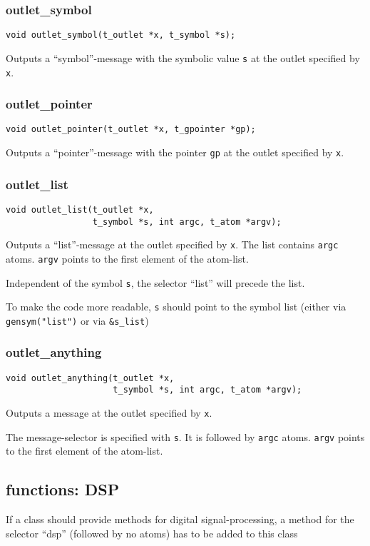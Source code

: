 \documentclass[12pt, a4paper,english,titlepage]{article}
\begin{document}
\begin{appendix}
\subsubsection{outlet\_symbol}
\begin{verbatim}
void outlet_symbol(t_outlet *x, t_symbol *s);
\end{verbatim}
Outputs a ``symbol''-message with the symbolic value \verb+s+
at the outlet specified by \verb+x+.

\subsubsection{outlet\_pointer}
\begin{verbatim}
void outlet_pointer(t_outlet *x, t_gpointer *gp);
\end{verbatim}
Outputs a ``pointer''-message with the pointer \verb+gp+
at the outlet specified by \verb+x+.

\subsubsection{outlet\_list}
\begin{verbatim}
void outlet_list(t_outlet *x,
                 t_symbol *s, int argc, t_atom *argv);
\end{verbatim}
Outputs a ``list''-message at the outlet specified by \verb+x+.
The list contains \verb+argc+ atoms.
\verb+argv+ points to the first element of the atom-list.

Independent of the symbol \verb+s+, the selector ``list'' will precede
the list.

To make the code more readable,
\verb+s+ should point to the symbol list
(either via \verb+gensym("list")+ or via \verb+&s_list+)

\subsubsection{outlet\_anything}
\begin{verbatim}
void outlet_anything(t_outlet *x,
                     t_symbol *s, int argc, t_atom *argv);
\end{verbatim}
Outputs a message at the outlet specified by \verb+x+.

The message-selector is specified with \verb+s+.
It is followed by \verb+argc+ atoms.
\verb+argv+ points to the first element of the atom-list.

\subsection{functions: DSP}
If a class should provide methods for digital signal-processing,
a method for the selector ``dsp'' (followed by no atoms)
has to be added to this class


\end{appendix}
\end{document}

